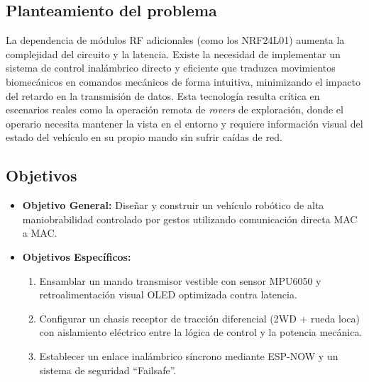 \documentclass[conference]{IEEEtran}
\begin{document}
\subsection{Planteamiento del problema}
La dependencia de módulos RF adicionales (como los NRF24L01) aumenta la complejidad del circuito y la latencia. Existe la necesidad de implementar un sistema de control inalámbrico directo y eficiente que traduzca movimientos biomecánicos en comandos mecánicos de forma intuitiva, minimizando el impacto del retardo en la transmisión de datos. Esta tecnología resulta crítica en escenarios reales como la operación remota de \textit{rovers} de exploración, donde el operario necesita mantener la vista en el entorno y requiere información visual del estado del vehículo en su propio mando sin sufrir caídas de red.

\subsection{Objetivos}

\begin{itemize}
    \item \textbf{Objetivo General:} Diseñar y construir un vehículo robótico de alta maniobrabilidad controlado por gestos utilizando comunicación directa MAC a MAC.
    \item \textbf{Objetivos Específicos:}
    \begin{enumerate}
        \item Ensamblar un mando transmisor vestible con sensor MPU6050 y retroalimentación visual OLED optimizada contra latencia.
        \item Configurar un chasis receptor de tracción diferencial (2WD + rueda loca) con aislamiento eléctrico entre la lógica de control y la potencia mecánica.
        \item Establecer un enlace inalámbrico síncrono mediante ESP-NOW y un sistema de seguridad “Failsafe”.
    \end{enumerate}
\end{itemize}
\end{document}
